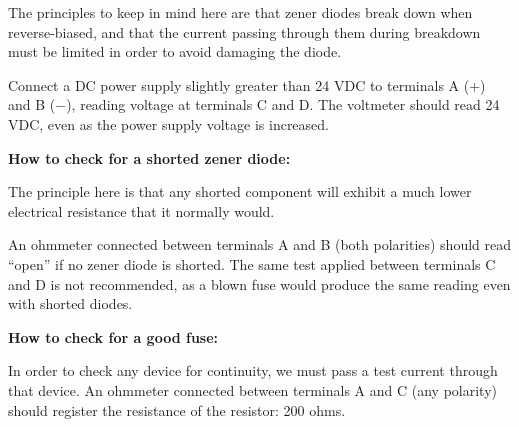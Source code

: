 The principles to keep in mind here are that zener diodes break down when reverse-biased, and that the current passing through them during breakdown must be limited in order to avoid damaging the diode.  

Connect a DC power supply slightly greater than 24 VDC to terminals A (+) and B ($-$), reading voltage at terminals C and D.  The voltmeter should read 24 VDC, even as the power supply voltage is increased.

\vskip 20pt

\noindent
{\bf How to check for a shorted zener diode:}

The principle here is that any shorted component will exhibit a much lower electrical resistance that it normally would.

An ohmmeter connected between terminals A and B (both polarities) should read ``open'' if no zener diode is shorted.  The same test applied between terminals C and D is not recommended, as a blown fuse would produce the same reading even with shorted diodes.

\vskip 20pt

\noindent
{\bf How to check for a good fuse:}

In order to check any device for continuity, we must pass a test current through that device.  An ohmmeter connected between terminals A and C (any polarity) should register the resistance of the resistor: 200 ohms.




